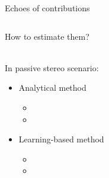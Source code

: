 \begin{frame}[t]{Echoes of contributions}

    \pause
    \begin{columns}[T,onlytextwidth]

        \begin{column}{0.48\textwidth}
            \begin{center}
                \alert{How to estimate them?}
            \end{center}
            \\In passive stereo scenario:
            \begin{itemize}
                \item Analytical method{\footnotesize
                \begin{itemize}
                    \item[\cmark] 
                    \item[\xmark] 
                \end{itemize}}
                \item Learning-based method{\footnotesize
                \begin{itemize}
                    \item[\cmark] 
                    \item[\xmark] 
                \end{itemize}}
            \end{itemize}
        \end{column}

        \pause


\end{columns}
\end{frame}
